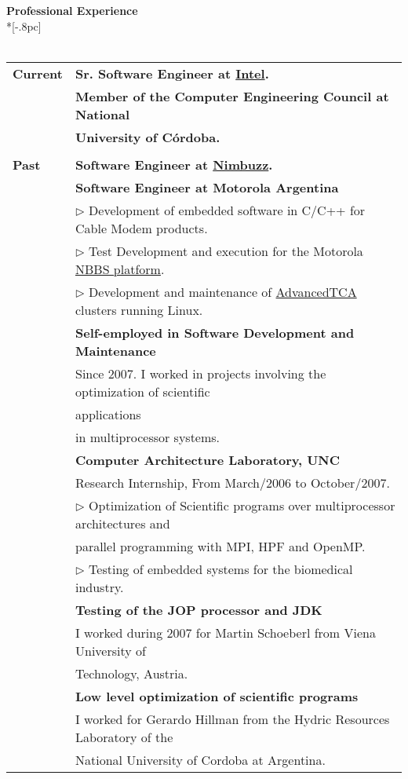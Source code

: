\documentclass[a4paper,11pt,english]{article}
\begin{document}
{\large \bf Professional Experience}\\*[-.8pc]
\underline{\hspace{6in}}
\\
\\
\begin{tabular}{ p{2cm} l }
  {\bf Current} & {\bf Sr. Software Engineer at \href{http://www.intel.com}{Intel}.}\\ 
                & {\bf Member of the Computer Engineering Council at National} \\
				& {\bf University of C\'ordoba.}\\ \\
  {\bf Past}& 	{\bf Software Engineer at \href{http://www.nimbuzz.com/en/about}{Nimbuzz}.}\\
			& 	{\bf Software Engineer at Motorola Argentina}\\
			& 	$\triangleright$ Development of embedded software in C/C++ for Cable Modem products.\\
			&	$\triangleright$ Test Development and execution for the Motorola \href{http://www.netopia.com/software/products/nbbs/nbbs_ds.pdf}{NBBS platform}.\\
			&	$\triangleright$ Development and maintenance of \href{http://en.wikipedia.org/wiki/Advanced_Telecommunications_Computing_Architecture}{AdvancedTCA} clusters running Linux.\\
			& 	{\bf Self-employed in Software Development and Maintenance}\\
			&	Since 2007. I worked in projects involving the optimization of scientific\\
			&	applications\\
			& 	in multiprocessor systems.\\
			& 	{\bf Computer Architecture Laboratory, UNC}\\
			& 	Research Internship, From March/2006 to October/2007.\\
			& 	$\triangleright$ Optimization of Scientific programs over multiprocessor architectures and\\
			& 	parallel programming with MPI, HPF and OpenMP.\\
			& 	$\triangleright$ Testing of embedded systems for the biomedical industry.\\
			& 	{\bf Testing of the JOP processor and JDK}\\
			& 	I worked during 2007 for Martin Schoeberl from Viena University of\\
			&	Technology,	Austria.\\
			& 	{\bf Low level optimization of scientific programs}\\
			& 	I worked for Gerardo Hillman from the Hydric Resources Laboratory of the\\
			& 	National University of Cordoba at Argentina.\\
				
\end{tabular} 
\end{document}
